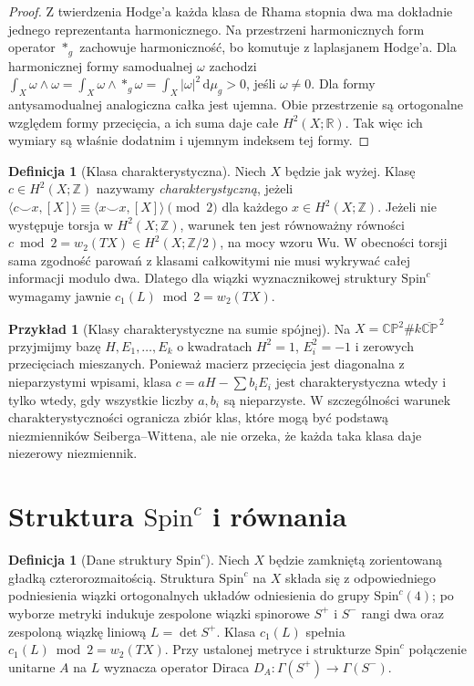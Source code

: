 \documentclass[11pt,a4paper]{report}
\numberwithin{equation}{section}
\theoremstyle{plain}
\theoremstyle{definition}
\newtheorem{definicja}[twierdzenie]{Definicja}
\newtheorem{przyklad}[twierdzenie]{Przykład}
\theoremstyle{remark}
\begin{document}
\begin{proof}
Z twierdzenia Hodge'a każda klasa de Rhama stopnia dwa
ma dokładnie jednego reprezentanta harmonicznego.
Na przestrzeni harmonicznych form operator $*_g$ zachowuje
harmoniczność, bo komutuje z laplasjanem Hodge'a.
Dla harmonicznej formy samodualnej $\omega$ zachodzi
$\int_X\omega\wedge\omega=\int_X\omega\wedge*_g\omega
=\int_X|\omega|^2\,\mathrm d\mu_g>0$, jeśli $\omega\ne0$.
Dla formy antysamodualnej analogiczna całka jest ujemna.
Obie przestrzenie są ortogonalne względem formy przecięcia,
a ich suma daje całe $H^2(X;\mathbb R)$.
Tak więc ich wymiary są właśnie dodatnim i ujemnym
indeksem tej formy.
\end{proof}

\begin{definicja}[Klasa charakterystyczna]
Niech $X$ będzie jak wyżej. Klasę $c\in H^2(X;\mathbb Z)$
nazywamy \emph{charakterystyczną}, jeżeli
$\langle c\smile x,[X]\rangle\equiv
\langle x\smile x,[X]\rangle\pmod2$
dla każdego $x\in H^2(X;\mathbb Z)$.
Jeżeli nie występuje torsja w $H^2(X;\mathbb Z)$,
warunek ten jest równoważny równości
$c\bmod2=w_2(TX)\in H^2(X;\mathbb Z/2)$,
na mocy wzoru Wu. W obecności torsji sama zgodność
parowań z klasami całkowitymi nie musi wykrywać całej
informacji modulo dwa. Dlatego dla wiązki wyznacznikowej
struktury $\mathrm{Spin}^c$ wymagamy jawnie
$c_1(L)\bmod2=w_2(TX)$.
\end{definicja}

\begin{przyklad}[Klasy charakterystyczne na sumie spójnej]
Na $X=\mathbb{CP}^2\#k\overline{\mathbb{CP}}^{\,2}$
przyjmijmy bazę $H,E_1,\ldots,E_k$ o kwadratach
$H^2=1$, $E_i^2=-1$ i zerowych przecięciach mieszanych.
Ponieważ macierz przecięcia jest diagonalna z nieparzystymi
wpisami, klasa $c=aH-\sum b_iE_i$ jest charakterystyczna
wtedy i tylko wtedy, gdy wszystkie liczby $a,b_i$ są
nieparzyste. W szczególności warunek charakterystyczności
ogranicza zbiór klas, które mogą być podstawą
niezmienników Seiberga--Wittena, ale nie orzeka,
że każda taka klasa daje niezerowy niezmiennik.
\end{przyklad}

\section{Struktura \texorpdfstring{$\mathrm{Spin}^c$}{Spinc} i równania}
\label{sec:tg-sw-equations}

\begin{definicja}[Dane struktury $\mathrm{Spin}^c$]
Niech $X$ będzie zamkniętą zorientowaną gładką
czterorozmaitością. Struktura $\mathrm{Spin}^c$ na $X$
składa się z odpowiedniego podniesienia wiązki
ortogonalnych układów odniesienia do grupy
$\mathrm{Spin}^c(4)$; po wyborze metryki indukuje
zespolone wiązki spinorowe $S^+$ i $S^-$ rangi dwa
oraz zespoloną wiązkę liniową $L=\det S^+$.
Klasa $c_1(L)$ spełnia $c_1(L)\bmod2=w_2(TX)$.
Przy ustalonej metryce i strukturze $\mathrm{Spin}^c$
połączenie unitarne $A$ na $L$ wyznacza operator Diraca
$D_A:\Gamma(S^+)\to\Gamma(S^-)$.
\end{definicja}
\end{document}
